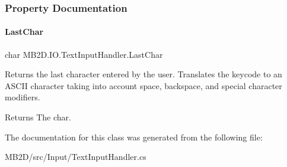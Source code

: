 \subsubsection{Property Documentation}
\hypertarget{class_m_b2_d_1_1_i_o_1_1_text_input_handler_a874b0ae4b35ff53064c893e49562dfeb}{}\label{class_m_b2_d_1_1_i_o_1_1_text_input_handler_a874b0ae4b35ff53064c893e49562dfeb} 
\paragraph{\texorpdfstring{Last\+Char}{LastChar}}
{\footnotesize\ttfamily char M\+B2\+D.\+I\+O.\+Text\+Input\+Handler.\+Last\+Char\hspace{0.3cm}{\ttfamily [get]}}



Returns the last character entered by the user. Translates the keycode to an A\+S\+C\+II character taking into account space, backspace, and special character modifiers. 

\begin{DoxyReturn}{Returns}
The char.
\end{DoxyReturn}


The documentation for this class was generated from the following file\+:\begin{DoxyCompactItemize}
\item 
M\+B2\+D/src/\+Input/Text\+Input\+Handler.\+cs\end{DoxyCompactItemize}
